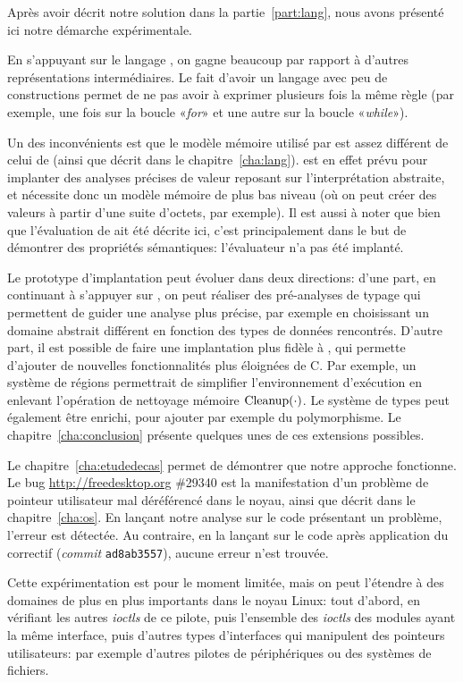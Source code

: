 
Après avoir décrit notre solution dans la partie~\ref{part:lang}, nous avons
présenté ici notre démarche expérimentale.

En s'appuyant sur le langage \newspeak, on gagne beaucoup par rapport à d'autres
représentations intermédiaires. Le fait d'avoir un langage avec peu de
constructions permet de ne pas avoir à exprimer plusieurs fois la même règle
(par exemple, une fois sur la boucle «\emph{for}» et une autre sur la boucle
«\emph{while}»).

Un des inconvénients est que le modèle mémoire utilisé par \newspeak est assez
différent de celui de \langname (ainsi que décrit dans le
chapitre~\ref{cha:lang}). \newspeak est en effet prévu pour implanter des
analyses précises de valeur reposant sur l'interprétation abstraite, et
nécessite donc un modèle mémoire de plus bas niveau (où on peut créer des
valeurs à partir d'une suite d'octets, par exemple). Il est aussi à noter que
bien que l'évaluation de \langname ait été décrite ici, c'est principalement
dans le but de démontrer des propriétés sémantiques: l'évaluateur n'a pas été
implanté.

Le prototype d'implantation peut évoluer dans deux directions: d'une part, en
continuant à s'appuyer sur \newspeak, on peut réaliser des pré-analyses de
typage qui permettent de guider une analyse plus précise, par exemple en
choisissant un domaine abstrait différent en fonction des types de données
rencontrés. D'autre part, il est possible de faire une implantation plus fidèle
à \langname, qui permette d'ajouter de nouvelles fonctionnalités plus éloignées
de C. Par exemple, un système de régions permettrait de simplifier
l'environnement d'exécution en enlevant l'opération de nettoyage mémoire
$\mathrm{Cleanup}(\cdot)$. Le système de types peut également être enrichi, pour ajouter
par exemple du polymorphisme. Le chapitre~\ref{cha:conclusion} présente quelques
unes de ces extensions possibles.

Le chapitre~\ref{cha:etudedecas} permet de démontrer que notre approche
fonctionne. Le bug \url{http://freedesktop.org} \#29340 est la manifestation
d'un problème de pointeur utilisateur mal déréférencé dans le noyau, ainsi que
décrit dans le chapitre~\ref{cha:os}. En lançant notre analyse sur le code
présentant un problème, l'erreur est détectée. Au contraire, en la lançant sur
le code après application du correctif (\emph{commit} \texttt{ad8ab3557}),
aucune erreur n'est trouvée.

Cette expérimentation est pour le moment limitée, mais on peut l'étendre à des
domaines de plus en plus importants dans le noyau Linux: tout d'abord, en
vérifiant les autres \emph{ioctls} de ce pilote, puis l'ensemble des
\emph{ioctls} des modules ayant la même interface, puis d'autres types
d'interfaces qui manipulent des pointeurs utilisateurs: par exemple d'autres
pilotes de périphériques ou des systèmes de fichiers.

